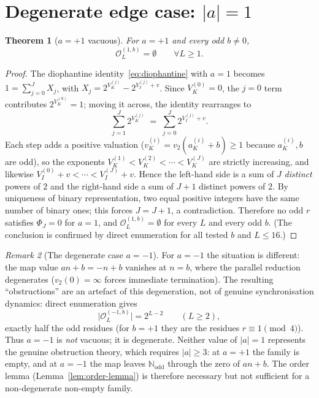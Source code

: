 \documentclass[11pt,reqno]{amsart}
\theoremstyle{plain}
\newtheorem{theorem}{Theorem}[section]
\theoremstyle{definition}
\theoremstyle{remark}
\newtheorem{remark}[theorem]{Remark}
\newcommand{\Obs}{\mathcal{O}}
\newcommand{\Vk}{V_{K}}
\newcommand{\Vi}{V_{I}}
\newcommand{\vk}{v_{K}}
\newcommand{\vtwo}{v_{2}}
\begin{document}
\section{Degenerate edge case: \texorpdfstring{$\lvert a \rvert = 1$}{|a| = 1}}\label{sec:edge}

\begin{theorem}[$a = +1$ vacuous]\label{thm:edge-case}
For $a = +1$ and every odd $b \ne 0$,
\[
\Obs_L^{(1,b)} = \emptyset \qquad \forall L \ge 1.
\]
\end{theorem}

\begin{proof}
The diophantine identity~\eqref{eq:diophantine} with $a = 1$ becomes
$1 = \sum_{j=0}^{J} X_j$, with $X_j = 2^{\Vk^{(j)}} - 2^{\Vi^{(j)} + v}$.
Since $\Vk^{(0)} = 0$, the $j = 0$ term contributes $2^{\Vk^{(0)}} = 1$;
moving it across, the identity rearranges to
\[
\sum_{j=1}^{J} 2^{\Vk^{(j)}} \;=\; \sum_{j=0}^{J} 2^{\Vi^{(j)} + v}.
\]
Each step adds a positive valuation ($\vk^{(i)} = \vtwo(a_K^{(i)} + b)
\ge 1$ because $a_K^{(i)}, b$ are odd), so the exponents
$\Vk^{(1)} < \Vk^{(2)} < \cdots < \Vk^{(J)}$ are strictly increasing, and
likewise $\Vi^{(0)} + v < \cdots < \Vi^{(J)} + v$. Hence the left-hand
side is a sum of $J$ \emph{distinct} powers of $2$ and the right-hand
side a sum of $J + 1$ distinct powers of $2$. By uniqueness of binary
representation, two equal positive integers have the same number of
binary ones; this forces $J = J + 1$, a contradiction. Therefore no
odd $r$ satisfies $\Phi_J = 0$ for $a = 1$, and $\Obs_L^{(1,b)} =
\emptyset$ for every $L$ and every odd $b$. (The conclusion is confirmed
by direct enumeration for all tested $b$ and $L \le 16$.) \qedhere
\end{proof}

\begin{remark}[The degenerate case $a = -1$]\label{rem:a-minus-1}
For $a = -1$ the situation is different: the map value $an + b = -n + b$
vanishes at $n = b$, where the parallel reduction degenerates
($\vtwo(0) = \infty$ forces immediate termination). The resulting
``obstructions'' are an artefact of this degeneration, not of genuine
synchronisation dynamics: direct enumeration gives
\[
\lvert \Obs_L^{(-1,b)} \rvert = 2^{L-2} \qquad (L \ge 2),
\]
exactly half the odd residues (for $b = +1$ they are the residues
$r \equiv 1 \pmod 4$). Thus $a = -1$ is \emph{not} vacuous; it is
degenerate. Neither value of $\lvert a \rvert = 1$ represents the
genuine obstruction theory, which requires $\lvert a \rvert \ge 3$: at
$a = +1$ the family is empty, and at $a = -1$ the map leaves
$\mathbb{N}_{\mathrm{odd}}$ through the zero of $an + b$. The order
lemma (Lemma~\ref{lem:order-lemma}) is therefore necessary but not
sufficient for a non-degenerate non-empty family.
\end{remark}
\end{document}
